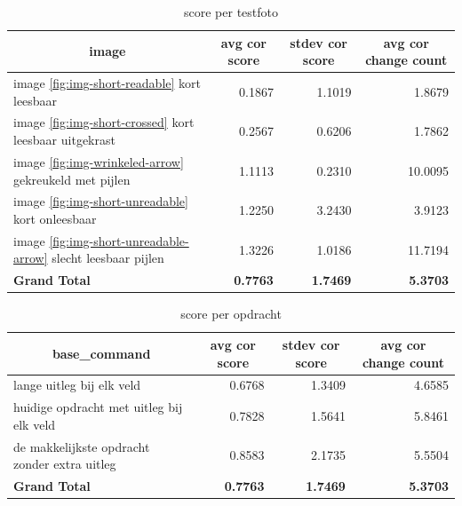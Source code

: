 \documentclass[12pt]{article}
\begin{document}
\noindent\begin{table}[H]
\caption{score per testfoto}
\label{fig:score-image}
\begin{tabularx}{\textwidth}{X *3{r}}
    \toprule
    \multicolumn{1}{c}{\textbf{image}} & \multicolumn{1}{c}{\textbf{avg cor score}} & \multicolumn{1}{c}{\textbf{stdev cor score}} & \multicolumn{1}{c}{\textbf{avg cor change count}} \\
    \midrule
    image \ref{fig:img-short-readable} kort leesbaar & 0.1867 & 1.1019 & 1.8679 \\
    image \ref{fig:img-short-crossed} kort leesbaar uitgekrast & 0.2567 & 0.6206 & 1.7862 \\
    image \ref{fig:img-wrinkeled-arrow} gekreukeld met pijlen & 1.1113 & 0.2310 & 10.0095 \\
    image \ref{fig:img-short-unreadable} kort onleesbaar & 1.2250 & 3.2430 & 3.9123 \\
    image \ref{fig:img-short-unreadable-arrow} slecht leesbaar pijlen & 1.3226 & 1.0186 & 11.7194 \\
    \midrule
    \textbf{Grand Total} & \textbf{0.7763} & \textbf{1.7469} & \textbf{5.3703} \\
    \bottomrule
\end{tabularx}%
\end{table}




\noindent\begin{table}[H]
\caption{score per opdracht}
\label{fig:score-command}
\begin{tabularx}{\textwidth}{X *3{r}}
    \toprule
    \multicolumn{1}{c}{\textbf{base\_command}} & \multicolumn{1}{c}{\textbf{avg cor score}} & \multicolumn{1}{c}{\textbf{stdev cor score}} & \multicolumn{1}{c}{\textbf{avg cor change count}} \\
    \midrule
    lange uitleg bij elk veld & 0.6768 & 1.3409 & 4.6585 \\
    huidige opdracht met uitleg bij elk veld & 0.7828 & 1.5641 & 5.8461 \\
    de makkelijkste opdracht zonder extra uitleg & 0.8583 & 2.1735 & 5.5504 \\
    \midrule
    \textbf{Grand Total} & \textbf{0.7763} & \textbf{1.7469} & \textbf{5.3703} \\
    \bottomrule
\end{tabularx}%
\end{table}
\end{document}
